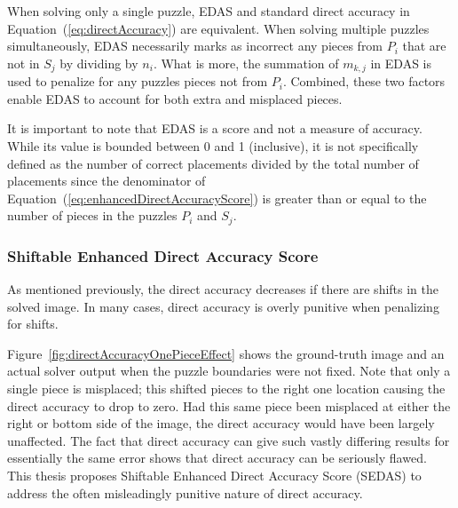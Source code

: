 \documentclass{report}
\def\eref#1{(\ref{#1})}
\begin{document}
When solving only a single puzzle, EDAS and standard direct accuracy in Equation~\eref{eq:directAccuracy} are equivalent.  When solving multiple puzzles simultaneously, EDAS necessarily marks as incorrect any pieces from $P_i$ that are not in $S_j$ by dividing by $n_i$.  What is more, the summation of $m_{k,j}$ in EDAS is used to penalize for any puzzles pieces not from $P_i$.  Combined, these two factors enable EDAS to account for both extra and misplaced pieces.

It is important to note that EDAS is a score and not a measure of accuracy. While its value is bounded between 0 and 1 (inclusive), it is not specifically defined as the number of correct placements divided by the total number of placements since the denominator of Equation~\eref{eq:enhancedDirectAccuracyScore} is greater than or equal to the number of pieces in the puzzles $P_i$ and $S_j$.

\subsubsection{Shiftable Enhanced Direct Accuracy Score}\label{sec:shiftableEnhancedDirectAccuracy}

As mentioned previously, the direct accuracy decreases if there are shifts in the solved image.  In many cases, direct accuracy is overly punitive when penalizing for shifts. 

Figure~\ref{fig:directAccuracyOnePieceEffect} shows the ground-truth image and an actual solver output when the puzzle boundaries were not fixed.  Note that only a single piece is misplaced; this shifted pieces to the right one location causing the direct accuracy to drop to zero.  Had this same piece been misplaced at either the right or bottom side of the image, the direct accuracy would have been largely unaffected.  The fact that direct accuracy can give such vastly differing results for essentially the same error shows that direct accuracy can be seriously flawed.  This thesis proposes Shiftable Enhanced Direct Accuracy Score (SEDAS) to address the often misleadingly punitive nature of direct accuracy. 
\end{document}
